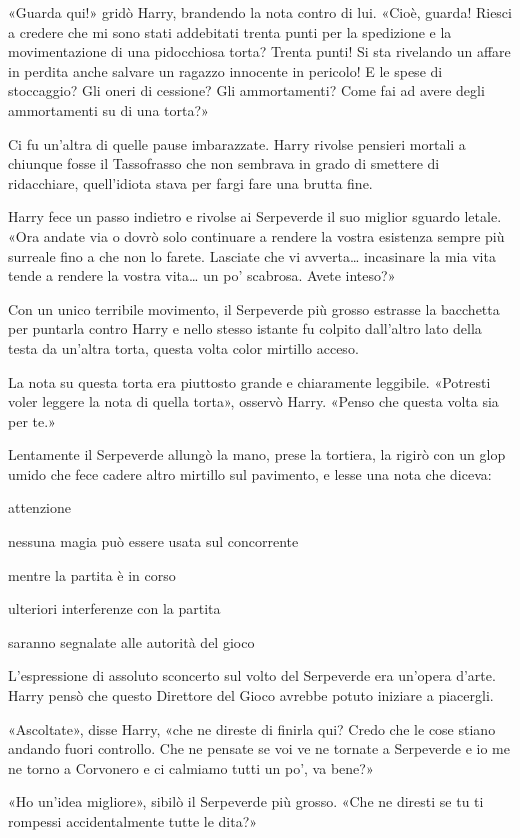 «Guarda qui!» gridò Harry, brandendo la nota contro di lui. «Cioè, guarda! Riesci a credere che mi sono stati addebitati trenta punti per la spedizione e la movimentazione di una pidocchiosa torta? Trenta punti! Si sta rivelando un affare in perdita anche salvare un ragazzo innocente in pericolo! E le spese di stoccaggio? Gli oneri di cessione? Gli ammortamenti? Come fai ad avere degli ammortamenti su di una torta?»

Ci fu un’altra di quelle pause imbarazzate. Harry rivolse pensieri mortali a chiunque fosse il Tassofrasso che non sembrava in grado di smettere di ridacchiare, quell’idiota stava per fargi fare una brutta fine.

Harry fece un passo indietro e rivolse ai Serpeverde il suo miglior sguardo letale. «Ora andate via o dovrò solo continuare a rendere la vostra esistenza sempre più surreale fino a che non lo farete. Lasciate che vi avverta… incasinare la mia vita tende a rendere la vostra vita… un po’ scabrosa. Avete inteso?»

Con un unico terribile movimento, il Serpeverde più grosso estrasse la bacchetta per puntarla contro Harry e nello stesso istante fu colpito dall’altro lato della testa da un’altra torta, questa volta color mirtillo acceso.

La nota su questa torta era piuttosto grande e chiaramente leggibile. «Potresti voler leggere la nota di quella torta», osservò Harry. «Penso che questa volta sia per te.»

Lentamente il Serpeverde allungò la mano, prese la tortiera, la rigirò con un glop umido che fece cadere altro mirtillo sul pavimento, e lesse una nota che diceva:

attenzione

nessuna magia può essere usata sul concorrente

mentre la partita è in corso

ulteriori interferenze con la partita

saranno segnalate alle autorità del gioco

L’espressione di assoluto sconcerto sul volto del Serpeverde era un’opera d’arte. Harry pensò che questo Direttore del Gioco avrebbe potuto iniziare a piacergli.

«Ascoltate», disse Harry, «che ne direste di finirla qui? Credo che le cose stiano andando fuori controllo. Che ne pensate se voi ve ne tornate a Serpeverde e io me ne torno a Corvonero e ci calmiamo tutti un po’, va bene?»

«Ho un’idea migliore», sibilò il Serpeverde più grosso. «Che ne diresti se tu ti rompessi accidentalmente tutte le dita?»

